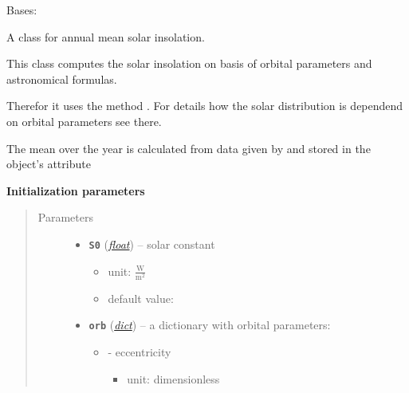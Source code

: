 \documentclass[letterpaper,10pt,english]{sphinxmanual}
\begin{document}
\begin{fulllineitems}
\label{api/climlab.radiation:climlab.radiation.insolation.AnnualMeanInsolation}
Bases: {\hyperref[api/climlab.radiation:climlab.radiation.insolation._Insolation]{\emph{}}}

A class for annual mean solar insolation.

This class computes the solar insolation on basis of orbital parameters and 
astronomical formulas.

Therefor it uses the method {\hyperref[api/climlab.solar:climlab.solar.insolation.daily_insolation]{\emph{}}}.
For details how the solar distribution is dependend on orbital parameters 
see there.

The mean over the year is calculated from data given by
{\hyperref[api/climlab.solar:climlab.solar.insolation.daily_insolation]{\emph{}}} and stored in the 
object's attribute 

\textbf{Initialization parameters}
\begin{quote}\begin{description}
\item[{Parameters}] \leavevmode\begin{itemize}
\item {} 
\textbf{\texttt{S0}} (\href{http://docs.python.org/2.7/library/functions.html\#float}{\emph{float}}) -- 
solar constant
\begin{itemize}
\item {} 
unit: \(\frac{\textrm{W}}{\textrm{m}^2}\)

\item {} 
default value: 

\end{itemize}


\item {} 
\textbf{\texttt{orb}} (\href{http://docs.python.org/2.7/library/stdtypes.html\#dict}{\emph{dict}}) -- 
a dictionary with orbital parameters:
\begin{itemize}
\item {} 
 - eccentricity
\begin{itemize}
\item {} 
unit: dimensionless


\end{itemize}
\end{itemize}
\end{itemize}
\end{description}
\end{quote}
\end{fulllineitems}
\end{document}
